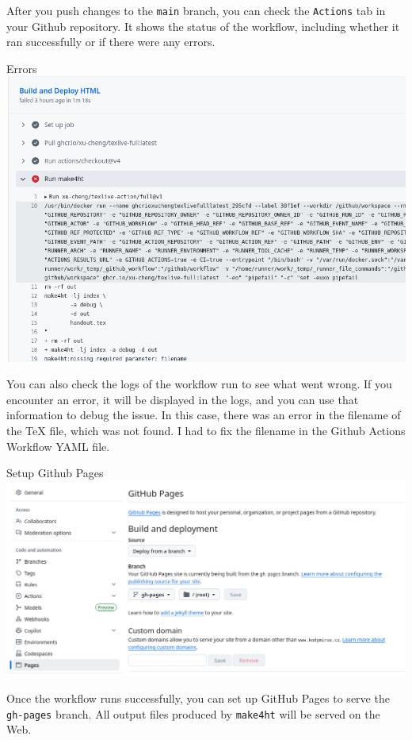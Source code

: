 After you push changes to the \texttt{main} branch, you can check the \texttt{Actions} tab in your
Github repository. It shows the status of the workflow, including whether it ran successfully or if there were any errors.

\begin{frame}[fragile]{Errors}
  \includegraphics{img/github-error.png}
\end{frame}

You can also check the logs of the workflow run to see what went wrong. If you
encounter an error, it will be displayed in the logs, and you can use that
information to debug the issue. In this case, there was an error in the filename 
of the TeX file, which was not found. I had to fix the filename in the Github
Actions Workflow YAML file.


\begin{frame}[fragile]{Setup Github Pages}
  \includegraphics{img/github-pages.png}
\end{frame}

Once the workflow runs successfully, you can set up GitHub Pages to serve the \texttt{gh-pages} branch.
All output files produced by \texttt{make4ht} will be served on the Web.


